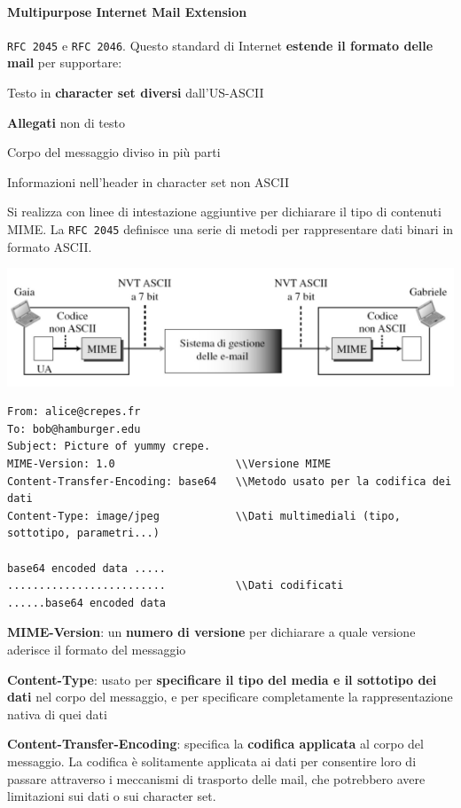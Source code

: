 \documentclass[10pt]{article}
\begin{document}
\paragraph{Multipurpose Internet Mail Extension} \texttt{RFC 2045} e \texttt{RFC 2046}. Questo standard di Internet \textbf{estende il formato delle mail} per supportare:
\begin{list}{}{}
\item Testo in \textbf{character set diversi} dall'US-ASCII
\item \textbf{Allegati} non di testo
\item Corpo del messaggio diviso in più parti
\item Informazioni nell'header in character set non ASCII
\end{list}
Si realizza con linee di intestazione aggiuntive per dichiarare il tipo di contenuti MIME. La \texttt{RFC 2045} definisce una serie di metodi per rappresentare dati binari in formato ASCII.
\begin{center}
\includegraphics[scale=1]{mime.png}
\end{center}
\begin{verbatim}
From: alice@crepes.fr
To: bob@hamburger.edu
Subject: Picture of yummy crepe.
MIME-Version: 1.0                   \\Versione MIME
Content-Transfer-Encoding: base64   \\Metodo usato per la codifica dei dati
Content-Type: image/jpeg            \\Dati multimediali (tipo, sottotipo, parametri...)

base64 encoded data .....
.........................           \\Dati codificati
......base64 encoded data
\end{verbatim}
\begin{list}{}{Campi nell'header:}
\item \textbf{MIME-Version}: un \textbf{numero di versione} per dichiarare a quale versione aderisce il formato del messaggio
\item \textbf{Content-Type}: usato per \textbf{specificare il tipo del media e il sottotipo dei dati} nel corpo del messaggio, e per specificare completamente la rappresentazione nativa di quei dati
\item \textbf{Content-Transfer-Encoding}: specifica la \textbf{codifica applicata} al corpo del messaggio. La codifica è solitamente applicata ai dati per consentire loro di passare attraverso i meccanismi di trasporto delle mail, che potrebbero avere limitazioni sui dati o sui character set.
\end{list}
\end{document}
